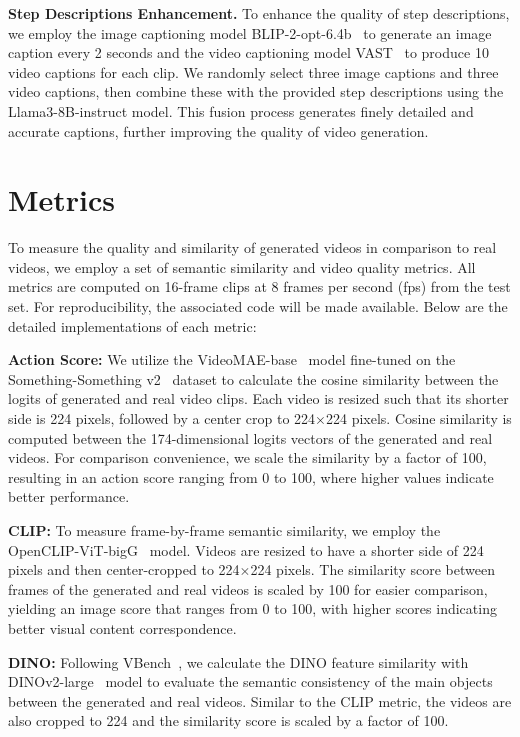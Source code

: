 \textbf{Step Descriptions Enhancement.}
To enhance the quality of step descriptions, we employ the image captioning model BLIP-2-opt-6.4b~\cite{blip2} to generate an image caption every 2 seconds and the video captioning model VAST~\cite{VAST} to produce 10 video captions for each clip. We randomly select three image captions and three video captions, then combine these with the provided step descriptions using the Llama3-8B-instruct model. This fusion process generates finely detailed and accurate captions, further improving the quality of video generation.

\section{Metrics}
\label{appendix metrics}
To measure the quality and similarity of generated videos in comparison to real videos, we employ a set of semantic similarity and video quality metrics. All metrics are computed on 16-frame clips at 8 frames per second (fps) from the test set. For reproducibility, the associated code will be made available. Below are the detailed implementations of each metric:

\textbf{Action Score:} We utilize the VideoMAE-base~\cite{videomae} model fine-tuned on the Something-Something v2~\cite{ssv2} dataset to calculate the cosine similarity between the logits of generated and real video clips. Each video is resized such that its shorter side is 224 pixels, followed by a center crop to 224$\times$224 pixels. Cosine similarity is computed between the 174-dimensional logits vectors of the generated and real videos. For comparison convenience, we scale the similarity by a factor of 100, resulting in an action score ranging from 0 to 100, where higher values indicate better performance.

\textbf{CLIP:} To measure frame-by-frame semantic similarity, we employ the OpenCLIP-ViT-bigG~\cite{openclip} model. Videos are resized to have a shorter side of 224 pixels and then center-cropped to 224$\times$224 pixels. The similarity score between frames of the generated and real videos is scaled by 100 for easier comparison, yielding an image score that ranges from 0 to 100, with higher scores indicating better visual content correspondence.

\textbf{DINO:} Following VBench~\cite{vbench}, we calculate the DINO feature similarity with DINOv2-large~\cite{dinov2} model to evaluate the semantic consistency of the main objects between the generated and real videos. Similar to the CLIP metric, the videos are also cropped to 224 and the similarity score is scaled by a factor of 100.

